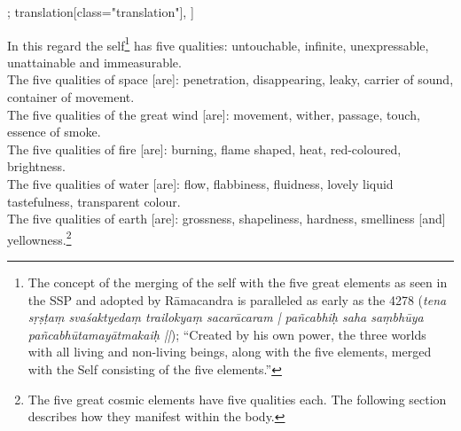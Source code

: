 \begin{alignment}[
  texts=edition[class="edition"];
  translation[class="translation"],
  ]
\begin{translation}
\begin{tlate}[p49_03]
      In this regard the self\footnote{The concept of the merging of the self with the five great elements as seen in the SSP and adopted by Rāmacandra is paralleled as early as the  4278 (\textit{tena sṛṣṭaṃ svaśaktyedaṃ trailokyaṃ sacarācaram | pañcabhiḥ saha saṃbhūya pañcabhūtamayātmakaiḥ ||}); ``Created by his own power, the three worlds with all living and non-living beings, along with the five elements, merged with the Self consisting of the five elements.''} has five qualities: untouchable, infinite, unexpressable, unattainable and immeasurable.\\%
      
      The five qualities of space [are]: penetration, disappearing, leaky, carrier of sound, container of movement.\\ 

      The five qualities of the great wind [are]: movement, wither, passage, touch, essence of smoke.\\

      The five qualities of fire [are]: burning, flame shaped, heat, red-coloured, brightness.\\

      The five qualities of water [are]: flow, flabbiness, fluidness, lovely liquid tastefulness, transparent colour.\\

      The five qualities of earth [are]: grossness, shapeliness, hardness, smelliness [and] yellowness.\footnote{The five great cosmic elements have five qualities each. The following section describes how they manifest within the body.}\\
      \flushpage
     \end{tlate}
  \end{translation}
\end{alignment}
\pagebreak %
